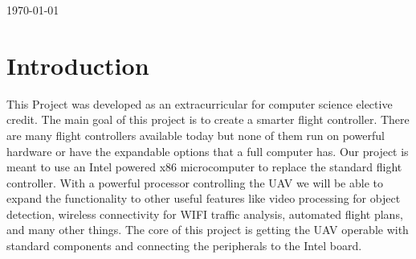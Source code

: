 \documentclass[letterpaper,10pt,notitlepage,fleqn]{article}
\begin{document}
\begin{titlepage}


{\large \today}\\[3cm] %




\vfill %



\end{titlepage}

\tableofcontents
\newpage

\section{Introduction}
\indent This Project was developed as an extracurricular for computer science elective credit.  The main goal of this project is to create a smarter flight controller. There are many flight controllers available today but none of them run on powerful hardware or have the expandable options that a full computer has. Our project is meant to use an Intel powered x86 microcomputer to replace the standard flight controller. With a powerful processor controlling the UAV we will be able
to expand the functionality to other useful features like video processing for object detection, wireless connectivity for WIFI traffic analysis, automated flight plans, and many other things. The core of this project is getting the UAV operable with standard components and connecting the peripherals to the Intel board.
\end{document}
